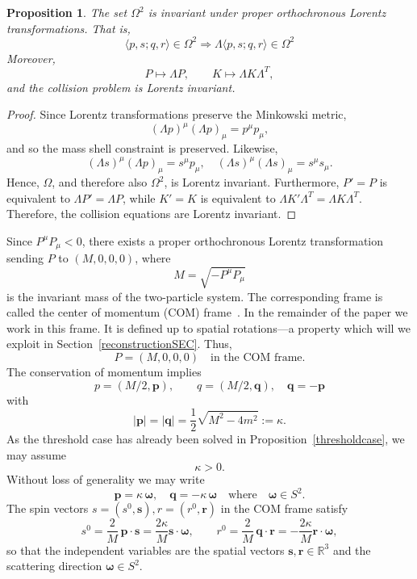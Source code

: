 \documentclass[10pt,a4paper]{amsart}
\newtheorem{proposition}[theorem]{Proposition}
\newcommand{\R}{\mathbb{R}}
\begin{document}
\begin{proposition}
The set $\Omega^2$ is invariant under proper orthochronous Lorentz transformations. That is, 
\[
\langle p,s;q,r\rangle\in\Omega^2\Rightarrow \Lambda\langle p,s;q,r\rangle \in\Omega^2
\]
Moreover,
\[
P\mapsto\Lambda P,\qquad K\mapsto\Lambda K\Lambda^T,
\]
and the collision problem is Lorentz invariant.
\end{proposition}

\begin{proof}
Since Lorentz transformations preserve the Minkowski metric, 
\[
(\Lambda p)^\mu(\Lambda p)_\mu=p^\mu p_\mu,
\]
and so the mass shell constraint is preserved.
Likewise,
\[
(\Lambda s)^\mu(\Lambda p)_\mu=s^\mu p_\mu,\quad
(\Lambda s)^\mu(\Lambda s)_\mu=s^\mu s_\mu.
\]
Hence, $\Omega$, and therefore also $\Omega^2$, is Lorentz invariant.
Furthermore, $P'=P$ is equivalent to $\Lambda P'=\Lambda P$, 
while $K'=K$ is equivalent to $\Lambda K'\Lambda^T=\Lambda K\Lambda^T$.
Therefore, the collision equations are Lorentz invariant.
\end{proof}

Since $P^\mu P_\mu<0$,
there exists a proper orthochronous Lorentz transformation sending $P$ to $(M,0,0,0)$, where
\[
M=\sqrt{-P^\mu P_\mu}
\]
is the invariant mass of the two-particle system.
The corresponding frame is called the center of momentum (COM) frame~\cite{Groot}.  In the remainder of the paper we work in this frame. It is defined up to spatial rotations---a property which will we exploit in Section~\ref{reconstructionSEC}. Thus,
\[
P=(M,0,0,0)\quad\text{in the COM frame.}
\]
The conservation of momentum implies
\[
p=(M/2,\bm p),\qquad q=(M/2,\bm q),\quad \bm q=-\bm p
\]
with
\begin{equation}\label{kappa}
|\bm p|=|\bm q|=\frac{1}{2}\sqrt{M^2-4m^2}:=\kappa.
\end{equation}
As the threshold case has already been solved in Proposition~\ref{thresholdcase}, we may assume 
\[
\kappa>0.
\]
Without loss of generality we may write
\begin{equation}\label{p}
\bm p=\kappa\,\bm \omega ,\quad \bm q=-\kappa\,\bm\omega \quad \text{where}\quad \bm \omega \in S^2.
\end{equation}
The spin vectors $s=(s^0,{\bm s}), r=(r^0,{\bm r})$ in the COM frame satisfy
\begin{equation}\label{s0}
s^0=\frac{2}{M}\,\bm p\cdot\bm s=\frac{2\kappa}{M}\bm s\cdot \bm \omega,
\qquad
r^0=\frac{2}{M}\,\bm q\cdot\bm r=-\frac{2\kappa}{M}\bm r\cdot \bm \omega,
\end{equation}
so that the independent variables are the spatial vectors $\bm s, \bm r\in\R^3$ and the scattering direction $\bm \omega\in S^2$.
\end{document}
